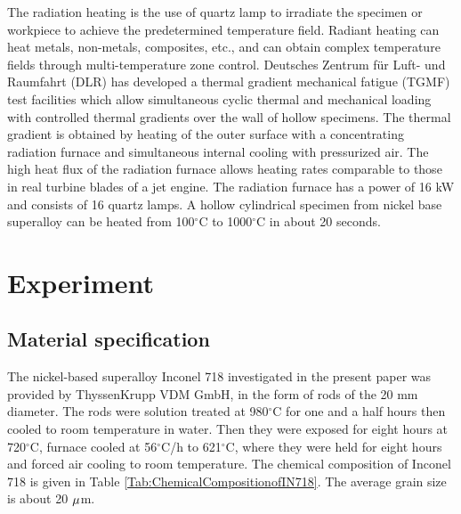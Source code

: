 \documentclass[preprint,5p,twocolumn,11pt,sort&compress]{elsarticle}
\begin{document}
The radiation heating is the use of quartz lamp to irradiate the specimen or workpiece to achieve the predetermined temperature field. Radiant heating can heat metals, non-metals, composites, etc., and can obtain complex temperature fields through multi-temperature zone control.
Deutsches Zentrum f\"{u}r Luft- und Raumfahrt (DLR) \cite{BAUFELD2008219} has developed a thermal gradient mechanical fatigue (TGMF) test facilities which allow simultaneous cyclic thermal and mechanical loading with controlled thermal gradients over the wall of hollow specimens. The thermal gradient is obtained by heating of the outer surface with a concentrating radiation furnace and simultaneous internal cooling with pressurized air. The high heat flux of the radiation furnace allows heating rates comparable to those in real turbine blades of a jet engine. The radiation furnace has a power of 16 kW and consists of 16 quartz lamps. A hollow cylindrical specimen from nickel base superalloy can be heated from 100$^\circ$C to 1000$^\circ$C in about 20 seconds. 

\section{Experiment}

\subsection{Material specification}
The nickel-based superalloy Inconel 718 investigated in the present paper was provided by ThyssenKrupp VDM GmbH, in the form of rods of the 20 mm diameter.
The rods were solution treated at 980$^{\circ}$C for one and a half hours then cooled to room temperature in water.
Then they were exposed for eight hours at 720$^{\circ}$C, furnace cooled at 56$^{\circ}$C/h to 621$^{\circ}$C, where they were held for eight hours and forced air cooling to room temperature.
The chemical composition of Inconel 718 is given in Table \ref{Tab:ChemicalCompositionofIN718}.
The average grain size is about 20 $\rm{\mu }$m.
\end{document}
